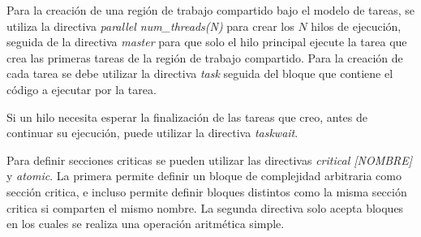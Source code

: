 Para la creación de una región de trabajo compartido bajo el modelo de tareas, se
utiliza la directiva \emph{parallel num\_threads(N)} para crear los $N$ hilos de
ejecución, seguida de la directiva \emph{master} para que solo el hilo principal
ejecute la tarea que crea las primeras tareas de la región de trabajo
compartido. Para la creación de cada tarea se debe utilizar la directiva
\emph{task} seguida del bloque que contiene el código a ejecutar por la tarea.

Si un hilo necesita esperar la finalización de las tareas que creo, antes de
continuar su ejecución, puede utilizar la directiva \emph{taskwait}.

Para definir secciones criticas se pueden utilizar las directivas \emph{critical
[NOMBRE]} y \emph{atomic}. La primera permite definir un bloque de complejidad
arbitraria como sección critica, e incluso permite definir bloques distintos
como la misma sección critica si comparten el mismo nombre. La segunda directiva
solo acepta bloques en los cuales se realiza una operación aritmética simple.
